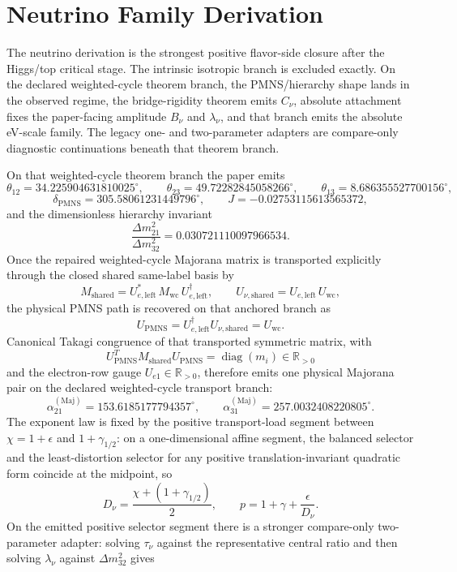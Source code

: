 \documentclass[11pt]{article}
\begin{document}
\section{Neutrino Family Derivation}

The neutrino derivation is the strongest positive flavor-side closure after the Higgs/top
critical stage. The intrinsic isotropic branch is excluded exactly. On the declared
weighted-cycle theorem branch, the PMNS/hierarchy shape lands in the observed regime, the
bridge-rigidity theorem emits \(C_\nu\), absolute attachment fixes the paper-facing amplitude
\(B_\nu\) and \(\lambda_\nu\), and that branch emits the absolute eV-scale family. The legacy one- and two-parameter adapters
are compare-only diagnostic continuations beneath that theorem branch.

On that weighted-cycle theorem branch the paper emits
\[
\theta_{12}=34.225904631810025^\circ,\qquad
\theta_{23}=49.72282845058266^\circ,\qquad
\theta_{13}=8.686355527700156^\circ,
\]
\[
\delta_{\mathrm{PMNS}}=305.58061231449796^\circ,\qquad
J=-0.02753115613565372,
\]
and the dimensionless hierarchy invariant
\[
\frac{\Delta m_{21}^2}{\Delta m_{32}^2}=0.030721110097966534.
\]
Once the repaired weighted-cycle Majorana matrix is transported explicitly through the closed shared same-label basis by
\[
M_{\mathrm{shared}}=U_{e,\mathrm{left}}^*\,M_{\mathrm{wc}}\,U_{e,\mathrm{left}}^\dagger,
\qquad
U_{\nu,\mathrm{shared}}=U_{e,\mathrm{left}}\,U_{\mathrm{wc}},
\]
the physical PMNS path is recovered on that anchored branch as
\[
U_{\mathrm{PMNS}}=U_{e,\mathrm{left}}^\dagger U_{\nu,\mathrm{shared}}=U_{\mathrm{wc}}.
\]
Canonical Takagi congruence of that transported symmetric matrix, with
\[
U_{\mathrm{PMNS}}^T M_{\mathrm{shared}} U_{\mathrm{PMNS}}=\operatorname{diag}(m_i)\in\mathbb R_{>0}
\]
and the electron-row gauge \(U_{e1}\in\mathbb R_{>0}\), therefore emits one physical Majorana pair on the declared weighted-cycle transport branch:
\[
\alpha_{21}^{(\mathrm{Maj})}=153.6185177794357^\circ,
\qquad
\alpha_{31}^{(\mathrm{Maj})}=257.0032408220805^\circ.
\]
The exponent law is fixed by the positive transport-load segment between
\(\chi=1+\epsilon\) and \(1+\gamma_{1/2}\): on a one-dimensional affine segment,
the balanced selector and the least-distortion selector for any positive
translation-invariant quadratic form coincide at the midpoint, so
\[
D_\nu=\frac{\chi+(1+\gamma_{1/2})}{2},
\qquad
p=1+\gamma+\frac{\epsilon}{D_\nu}.
\]
On the emitted positive selector segment there is a stronger compare-only two-parameter adapter: solving \(\tau_\nu\) against the representative central ratio and then solving \(\lambda_\nu\) against \(\Delta m_{32}^2\) gives
\end{document}
